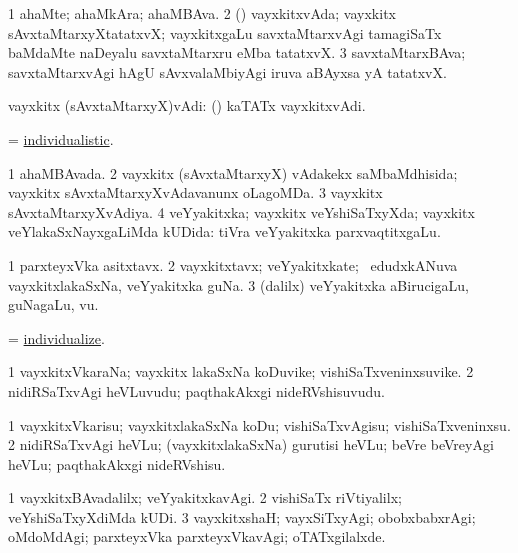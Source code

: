 \bentry
{}
\gl{\nA}
\bmng
\bnum
\num{1} ahaMte; ahaMkAra; ahaMBAva. 
\num{2} (\sashA) vayxkitxvAda; vayxkitx sAvxtaMtarxyXtatatxvX; vayxkitxgaLu savxtaMtarxvAgi tamagiSaTx baMdaMte naDeyalu savxtaMtarxru eMba tatatxvX. 
\num{3} savxtaMtarxBAva; savxtaMtarxvAgi hAgU sAvxvalaMbiyAgi iruva aBAyxsa yA tatatxvX. 
\enum
\emng
\eentry

\bentry
{}
\gl{\nA}
\bmng
vayxkitx (sAvxtaMtarxyX)vAdi:  (\ame) kaTATx vayxkitxvAdi. 
\emng
\eentry

\bentry
{}
\gl{\gu}
\bmng
 = \hyperlink{individualistic}{individualistic}. 
\emng
\eentry

\bentry
{}
\gl{\gu}
\bmng
\bnum
\num{1} ahaMBAvada. 
\num{2} vayxkitx (sAvxtaMtarxyX) vAdakekx saMbaMdhisida; vayxkitx sAvxtaMtarxyXvAdavanunx oLagoMDa. 
\num{3} vayxkitx sAvxtaMtarxyXvAdiya. 
\num{4} veYyakitxka; vayxkitx veYshiSaTxyXda; vayxkitx veYlakaSxNayxgaLiMda kUDida:  tiVra veYyakitxka parxvaqtitxgaLu. 
\enum
\emng
\eentry

\bentry
{}
\gl{\nA}
\bmng
\bnum
\num{1} parxteyxVka asitxtavx. 
\num{2} vayxkitxtavx; veYyakitxkate; \kanmu\ edudxkANuva vayxkitxlakaSxNa, veYyakitxka guNa. 
\num{3} (\bava dalilx) veYyakitxka aBirucigaLu, guNagaLu, \mo vu. 
\enum
\emng
\eentry

\bentry
{}
\gl{\sakirx}
\bmng
 = \hyperlink{individualize}{individualize}. 
\emng
\eentry

\bentry
{}
\gl{\nA}
\bmng
\bnum
\num{1} vayxkitxVkaraNa; vayxkitx lakaSxNa koDuvike; vishiSaTxveninxsuvike. 
\num{2} nidiRSaTxvAgi heVLuvudu; paqthakAkxgi nideRVshisuvudu. 
\enum
\emng
\eentry

\bentry
{}
\gl{\sakirx}
\bmng
\bnum
\num{1} vayxkitxVkarisu; vayxkitxlakaSxNa koDu; vishiSaTxvAgisu; vishiSaTxveninxsu. 
\num{2} nidiRSaTxvAgi heVLu; (vayxkitxlakaSxNa) gurutisi heVLu; beVre beVreyAgi heVLu; paqthakAkxgi nideRVshisu. 
\enum
\emng
\eentry

\bentry
{}
\gl{\kirxvi}
\bmng
\bnum
\num{1} vayxkitxBAvadalilx; veYyakitxkavAgi. 
\num{2} vishiSaTx riVtiyalilx; veYshiSaTxyXdiMda kUDi. 
\num{3} vayxkitxshaH; vayxSiTxyAgi; obobxbabxrAgi; oMdoMdAgi; parxteyxVka parxteyxVkavAgi; oTATxgilalxde. 
\enum
\emng
\eentry

